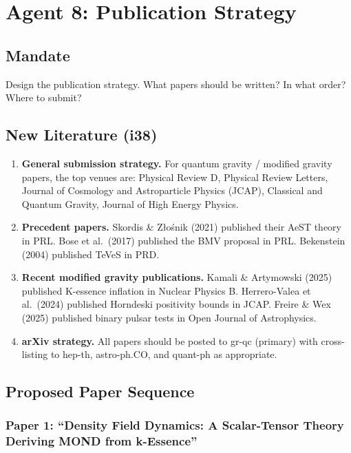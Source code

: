\documentclass[11pt,a4paper]{article}
\begin{document}
\section{Agent 8: Publication Strategy}
\label{sec:agent8}

\subsection{Mandate}

Design the publication strategy. What papers should be written? In what order? Where to submit?

\subsection{New Literature (i38)}

\begin{enumerate}
\item \textbf{General submission strategy.} For quantum gravity / modified gravity papers, the top venues are: Physical Review D, Physical Review Letters, Journal of Cosmology and Astroparticle Physics (JCAP), Classical and Quantum Gravity, Journal of High Energy Physics.

\item \textbf{Precedent papers.} Skordis \& Z\l o\'snik (2021) published their AeST theory in PRL. Bose et al.\ (2017) published the BMV proposal in PRL. Bekenstein (2004) published TeVeS in PRD.

\item \textbf{Recent modified gravity publications.} Kamali \& Artymowski (2025) published K-essence inflation in Nuclear Physics B. Herrero-Valea et al.\ (2024) published Horndeski positivity bounds in JCAP. Freire \& Wex (2025) published binary pulsar tests in Open Journal of Astrophysics.

\item \textbf{arXiv strategy.} All papers should be posted to gr-qc (primary) with cross-listing to hep-th, astro-ph.CO, and quant-ph as appropriate.
\end{enumerate}

\subsection{Proposed Paper Sequence}

\subsubsection{Paper 1: ``Density Field Dynamics: A Scalar-Tensor Theory Deriving MOND from k-Essence''}
\end{document}
